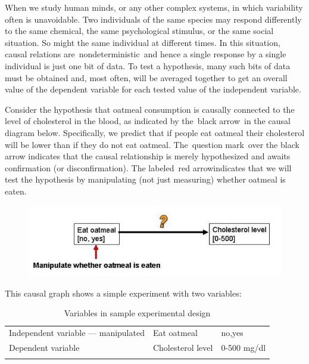 \begin{refsection}
When we study human minds, or any other complex systems, in which variability often is unavoidable. Two individuals of the same species may respond differently to the same chemical, the same psychological stimulus, or the same social situation. So might the same individual at different times. In this situation, causal relations are nondeterministic and hence a single response by a single individual is just one bit of data. To test a hypothesis, many such bits of data must be obtained and, most often, will be averaged together to get an overall value of the dependent variable for each tested value of the independent variable.

Consider the hypothesis that oatmeal consumption is causally connected to the level of cholesterol in the blood, as indicated by the black arrow in the causal diagram below. Specifically, we predict that if people eat oatmeal their cholesterol will be lower than if they do not eat oatmeal. The question mark over the black arrow indicates that the causal relationship is merely hypothesized and awaits confirmation (or disconfirmation). The labeled red arrowindicates that we will test the hypothesis by manipulating (not just measuring) whether oatmeal is eaten.

\begin{figure}[htbp]
\centering
\includegraphics[keepaspectratio,width=\textwidth,height=0.75\textheight]{cholesterolcausaldiagram1.jpg}
\label{cholesterolcausaldiagram1.jpg}
\end{figure}

This causal graph shows a simple experiment with two variables:
 \begin{longtable}[!t]{ | P{4cm} | P{3cm} | P{1.5cm} | }
\hline
{}&& \\ \hline
Independent variable --- manipulated&Eat oatmeal&no,yes \\ \hline
Dependent variable&Cholesterol level&0-500 mg/dl \\ \hline
\caption{Variables in sample experimental design}
\label{table: variables}
\end{longtable}



\end{refsection}
